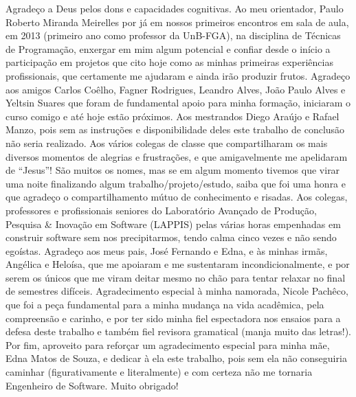 \begin{agradecimentos}

Agradeço a Deus pelos dons e capacidades cognitivas. Ao meu orientador, Paulo
Roberto Miranda Meirelles por já em nossos primeiros encontros em sala de aula,
em 2013 (primeiro ano como professor da UnB-FGA), na disciplina de Técnicas de
Programação, enxergar em mim algum potencial e confiar desde o início a
participação em projetos que cito hoje como as minhas primeiras experiências
profissionais, que certamente me ajudaram e ainda irão produzir frutos. Agradeço
aos amigos Carlos Coêlho, Fagner Rodrigues, Leandro Alves, João Paulo Alves e
Yeltsin Suares que foram de fundamental apoio para minha formação, iniciaram o
curso comigo e até hoje estão próximos. Aos mestrandos Diego Araújo e Rafael
Manzo, pois sem as instruções e disponibilidade deles este trabalho de conclusão
não seria realizado. Aos vários colegas de classe que compartilharam os mais
diversos momentos de alegrias e frustrações, e que amigavelmente me apelidaram de
“Jesus”! São muitos os nomes, mas se em algum momento tivemos que virar uma
noite finalizando algum trabalho/projeto/estudo, saiba que foi uma honra e que
agradeço o compartilhamento mútuo de conhecimento e risadas. Aos colegas,
professores e profissionais seniores do Laboratório Avançado de Produção,
Pesquisa \& Inovação em Software (LAPPIS) pelas várias horas empenhadas em
construir software sem nos precipitarmos, tendo calma cinco vezes e não sendo
egoístas. Agradeço aos meus pais, José Fernando e Edna, e às minhas irmãs,
Angélica e Heloísa, que me apoiaram e me sustentaram incondicionalmente, e por
serem os únicos que me viram deitar mesmo no chão para tentar relaxar no final
de semestres difíceis. Agradecimento especial à minha namorada, Nicole Pachêco,
que foi a peça fundamental para a minha mudança na vida acadêmica, pela
compreensão e carinho, e por ter sido minha fiel espectadora nos ensaios para a
defesa deste trabalho e também fiel revisora gramatical (manja muito das
letras!). Por fim, aproveito para reforçar um agradecimento especial para minha
mãe, Edna Matos de Souza, e dedicar à ela este trabalho, pois sem ela não
conseguiria caminhar (figurativamente e literalmente) e com certeza não me
tornaria Engenheiro de Software. Muito obrigado!

\end{agradecimentos}
